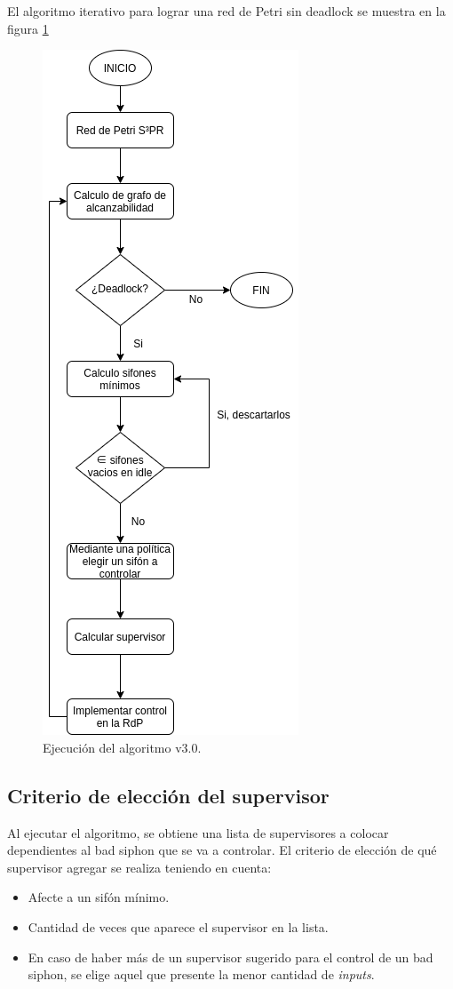 El algoritmo iterativo para lograr una red de Petri sin deadlock se muestra en la figura \ref{fig:fig3.10}

\begin{figure}[H]
	\centering
	\includegraphics[scale=0.5]{Figures/algoritmo3/desarrollo/diagrama_flujo.png}
	\caption{Ejecución del algoritmo v3.0.}
	\label{fig:fig3.10}
 \end{figure}

\subsection{Criterio de elección del supervisor} \label{sec:criterio}
Al ejecutar el algoritmo, se obtiene una lista de supervisores a colocar dependientes al bad siphon que se va a controlar. El criterio de elección de qué supervisor agregar se realiza teniendo en cuenta: 
\begin{itemize}
    \item Afecte a un sifón mínimo.
    \item Cantidad de veces que aparece el supervisor en la lista.
    \item En caso de haber más de un supervisor sugerido para el control de un bad siphon, se elige aquel que presente la menor cantidad de \textit{inputs}.
\end{itemize}


